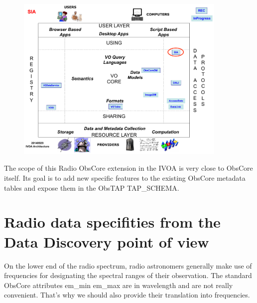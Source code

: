 \documentclass[11pt,a4paper]{ivoa}
\begin{document}


\begin{figure}[H]
\centering

\includegraphics[width=0.9\textwidth]{archdiag.png}
\label{fig:architecture}
\end{figure}


The scope of this Radio ObsCore extension in the IVOA is very close to ObsCore itself. 
Its goal is to add new specific features to the existing ObsCore metadata tables and expose 
them in the ObsTAP TAP\_SCHEMA. 
\section{Radio data specifities from the Data Discovery point of view}
\label{sec:specificities}
On the lower end of the radio spectrum, radio astronomers generally make use of 
frequencies for designating the spectral ranges of their observation. The standard 
ObsCore attributes em\_min em\_max  are in wavelength and are not really convenient. 
That's why we should also provide their translation into frequencies. 
        
\end{document}
